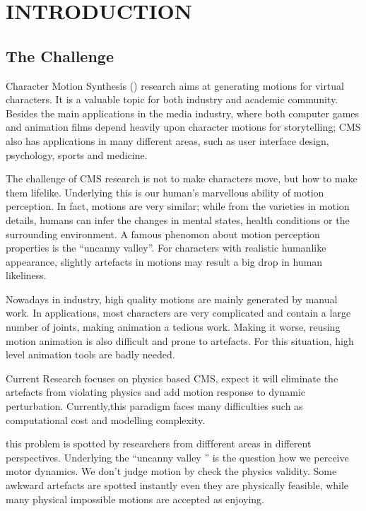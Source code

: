 \chapter{INTRODUCTION}
\label{chap:intro}
\graphicspath{{Introduction/IntroductionFigs/EPS/}{Introduction/IntroductionFigs/}}


\section{The Challenge}
Character Motion Synthesis (\cms) research aims at generating motions for virtual characters.
It is a valuable topic for both industry and academic community. 
Besides the main applications in the media industry, where both computer games and animation films depend heavily upon character motions for storytelling;  
CMS also has applications in many different areas, such as user interface design, psychology, sports and medicine.

The challenge of CMS research is not to make characters move, but how to make them lifelike. 
Underlying this is our human's marvellous ability of motion perception. 
In fact, motions are very similar; 
while from the varieties in motion details, humans can infer the changes in mental states, health conditions or the surrounding environment.
A famous phenomon about motion perception properties is the ``uncanny valley''.
For characters with realistic humanlike appearance, slightly artefacts in motions may result a big drop in human likeliness.



Nowadays in industry, high quality motions are mainly generated by manual work. 
In applications, most characters are very complicated and contain a large number of joints, making animation a tedious work.
Making it worse, reusing motion animation is also difficult and prone to artefacts.
For this situation, high level animation tools are badly needed. 

Current Research focuses on physics based CMS, expect it will eliminate the artefacts from violating physics and add motion response to dynamic perturbation.
Currently,this paradigm faces many difficulties such as computational cost and modelling complexity.

this problem is spotted by researchers from diffferent areas in different perspectives.
Underlying the ``uncanny valley '' is the question how we perceive motor dynamics.
We don’t judge motion by check the physics validity.
Some awkward artefacts are spotted instantly even they are physically feasible, while many physical impossible motions are accepted as enjoying. 

